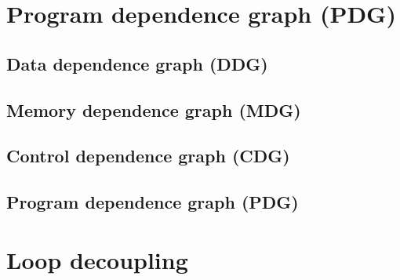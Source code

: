 \section{Program dependence graph (PDG)} \label{background-program-dependence-graph}

\cite{pdg}

\subsection{Data dependence graph (DDG)} \label{background-ddg}
\subsection{Memory dependence graph (MDG)} \label{background-mdg}
\subsection{Control dependence graph (CDG)} \label{background-cdg}
\subsection{Program dependence graph (PDG)} \label{background-pdg}

\section{Loop decoupling} \label{background-loop-decoupling}

\cite{iterator-recognition}